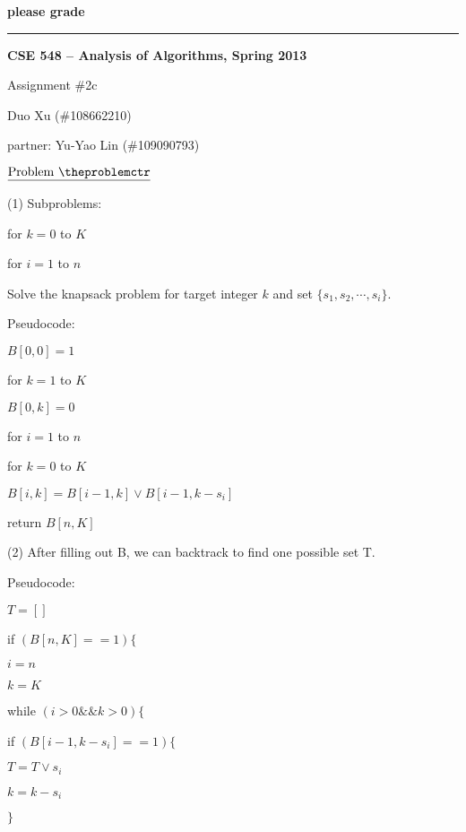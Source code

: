 \documentclass[11pt]{article}
\def\pp{\par\noindent}
\begin{document}
\centerline{\bf please grade}
\medskip
\hrule
\bigskip
\centerline{\bf CSE 548 -- Analysis of Algorithms, Spring 2013}
\medskip
\centerline{Assignment \#2c}
\medskip
\centerline{Duo Xu (\#108662210)}
\medskip
\centerline{partner: Yu-Yao Lin (\#109090793)}
\bigskip
\bigskip



\addtocounter{problemctr}{10}
\bigskip
\noindent
$\underline{\rm Problem\ \theproblemctr}$\pp
\noindent 
(1) Subproblems:

for $k = 0$ to $K$

\hspace{.5 cm} for $i = 1$ to $n$

\hspace{1 cm} Solve the knapsack problem for target integer $k$ and set $\{s_1, s_2, \cdots, s_i \}$. 

\bigskip

Pseudocode:

$B[0,0] = 1$

for $k = 1$ to $K$

\hspace{.5 cm} $B[0,k] = 0$

for $i = 1$ to $n$

\hspace{.5 cm} for $k = 0$ to $K$

\hspace{1 cm} $B[i, k] = B[i-1, k] \vee B[i-1, k-s_i]$

return $B[n, K]$


\bigskip
\bigskip
\noindent 
(2) After filling out B, we can backtrack to find one possible set T.

Pseudocode:

$T = []$

if $(B[n, K] == 1) \{$

\hspace{.5 cm}$i = n$

\hspace{.5 cm}$k = K$

\hspace{.5 cm} while $(i>0 \&\& k>0) \{$

\hspace{1 cm} if $(B[i-1, k-s_i] == 1) \{$

\hspace{1.5 cm} $T = T \vee s_i$

\hspace{1.5 cm} $k = k-s_i$

\hspace{1 cm} $\}$
\end{document}
